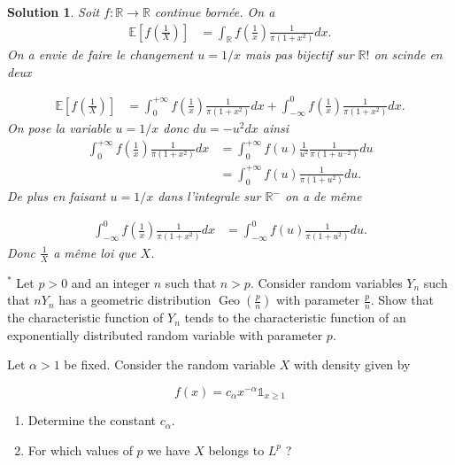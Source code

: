 \documentclass{article}
\newtheorem{solution}{Solution}
\begin{document}
\begin{solution}
  Soit $f:\mathbb R\longrightarrow \mathbb R$ continue born\'ee. On a
  \begin{align*}
    \mathbb E[f(\frac1X)] & =\int_\mathbb R f(\frac1x) \frac{1}{\pi(1+x^2)} dx.
  \end{align*}
  On a envie de faire le changement $u=1/x$ mais pas bijectif sur $\mathbb R!$ on scinde en deux

  \begin{align*}
    \mathbb E[f(\frac1X)] & =\int_0^{+\infty} f(\frac1x) \frac{1}{\pi(1+x^2)} dx+ \int_{-\infty}^0 f(\frac1x) \frac{1}{\pi(1+x^2)} dx.
  \end{align*}
  On pose la variable $u=1/x$ donc $du=-u^2 dx$ ainsi
  \begin{align*}
    \int_0^{+\infty} f(\frac1x) \frac{1}{\pi(1+x^2)} dx & =\int_0^{+\infty} f(u)\frac{1}{u^2}  \frac{1}{\pi(1+u^{-2})} du \\
                                                        & =\int_0^{+\infty} f(u) \frac{1}{\pi(1+u^2)} du.
  \end{align*}
  De plus en faisant $u=1/x$ dans l'integrale sur $\mathbb R^-$ on a de m\^eme

  \begin{align*}
    \int_{-\infty}^0 f(\frac1x) \frac{1}{\pi(1+x^2)} dx & =\int_{-\infty}^0 f(u) \frac{1}{\pi(1+u^2)} du.
  \end{align*}
  Donc $\frac1X$ a m\^eme loi que $X$.
\end{solution}

\begin{Exercise} ${ }^{*}$ Let $p>0$ and an integer $n$ such that $n>p$. Consider random variables $Y_{n}$ such that $n Y_{n}$ has a geometric distribution $\operatorname{Geo}\left(\frac{p}{n}\right)$ with parameter $\frac{p}{n}$. Show that the characteristic function of $Y_{n}$ tends to the characteristic function of an exponentially distributed random variable with parameter $p$.

\end{Exercise}

\begin{Exercise} Let $\alpha>1$ be fixed. Consider the random variable $X$ with density given by

  $$
    f(x)=c_{\alpha} x^{-\alpha} \mathbb{1}_{x \geq 1}
  $$

  \begin{enumerate}
    \item Determine the constant $c_{\alpha}$.

    \item For which values of $p$ we have $X$ belongs to $L^{p}$ ?

  \end{enumerate}
\end{Exercise}
\end{document}
